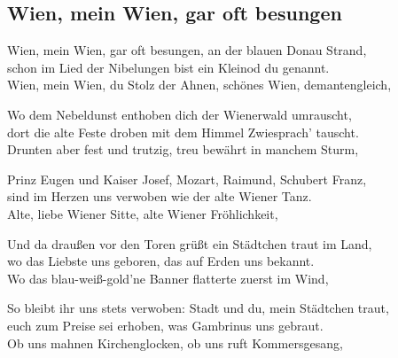 
\subsection*{Wien, mein Wien, gar oft besungen}
%
%
%
\nopagebreak
\hfill%
%
\nopagebreak
\thestrophe Wien, mein Wien, gar oft besungen, an der blauen Donau Strand, \\
schon im Lied der Nibelungen bist ein Kleinod du genannt. \\
Wien, mein Wien, du Stolz der Ahnen, schönes Wien, demantengleich, \\

\thestrophe Wo dem Nebeldunst enthoben dich der Wienerwald umrauscht,\\
dort die alte Feste droben mit dem Himmel Zwiesprach' tauscht. \\
Drunten aber fest und trutzig, treu bewährt in manchem Sturm, \\

\thestrophe Prinz Eugen und Kaiser Josef, Mozart, Raimund, Schubert Franz, \\
sind im Herzen uns verwoben wie der alte Wiener Tanz. \\
Alte, liebe Wiener Sitte, alte Wiener Fröhlichkeit, \\

\thestrophe Und da draußen vor den Toren grüßt ein Städtchen traut im Land, \\
wo das Liebste uns geboren, das auf Erden uns bekannt. \\
Wo das blau-weiß-gold'ne Banner flatterte zuerst im Wind, \\

\thestrophe So bleibt ihr uns stets verwoben: Stadt und du, mein Städtchen traut, \\
euch zum Preise sei erhoben, was Gambrinus uns gebraut. \\
Ob uns mahnen Kirchenglocken, ob uns ruft Kommersgesang, \\
